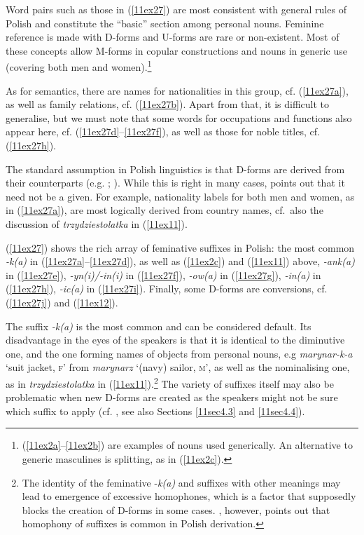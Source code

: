 \documentclass[output=paper,colorlinks,citecolor=brown]{langscibook}
\begin{document}
Word pairs such as those in (\ref{11ex27}) are most consistent with general rules of Polish and constitute the ``basic'' \citep[49]{kucala1978} section among personal nouns. Feminine reference is made with D-forms and U-forms are rare or non-existent. Most of these concepts allow M-forms in copular constructions and  nouns in generic use (covering both men and women).\footnote{(\ref{11ex2a}--\ref{11ex2b}) are examples of  nouns used generically. An alternative to generic masculines is splitting, as in (\ref{11ex2c}).}

As for semantics, there are names for nationalities in this group, cf. (\ref{11ex27a}), as well as family relations, cf. (\ref{11ex27b}). Apart from that, it is difficult to generalise, but we must note that some words for occupations and functions also appear here, cf. (\ref{11ex27d}--\ref{11ex27f}), as well as those for noble titles, cf. (\ref{11ex27h}).

The standard assumption in Polish linguistics is that D-forms are derived from their  counterparts (e.g. \citealt[422]{grzegorczykowa1998-rzeczownik}; \citealt[49]{kucala1978}). While this is right in many cases, \citet[134--135]{szpyra-kozlowska2021} points out that it need not be a given. For example, nationality labels for both men and women, as in (\ref{11ex27a}), are most logically derived from country names, cf.~also the discussion of \emph{trzydziestolatka} in (\ref{11ex11}).

(\ref{11ex27}) shows the rich array of feminative suffixes in Polish: the most common \emph{-k(a)} in (\ref{11ex27a}--\ref{11ex27d}), as well as (\ref{11ex2c}) and (\ref{11ex11}) above, \emph{-ank(a)} in (\ref{11ex27e}), \emph{-yn(i)/}\emph{-in(i)} in (\ref{11ex27f}), \emph{-ow(a)} in (\ref{11ex27g}), \emph{-in(a)} in (\ref{11ex27h}), \emph{-ic(a)} in (\ref{11ex27i}). Finally, some D-forms are conversions, cf. (\ref{11ex27j}) and (\ref{11ex12}).

The suffix \emph{-k(a)} is the most common and can be considered default. Its disadvantage in the eyes of the speakers is that it is identical to the diminutive one, and the one forming names of objects from personal nouns, e.g \emph{marynar-k-a }`suit jacket, \textsc{f}' from \emph{marynarz} `(navy) sailor, \textsc{m}', as well as the nominalising one, as in \emph{trzydziestolatka} in (\ref{11ex11}).\footnote{The identity of the feminative -\emph{k(a)} and suffixes with other meanings may lead to emergence of excessive homophones, which is a factor that supposedly blocks the creation of D-forms in some cases. \citet[191--192, 262--265]{szpyra-kozlowska2021}, however, points out that homophony of suffixes is common in Polish derivation.\label{11ftn25}} The variety of suffixes itself may also be problematic when new D-forms are created as the speakers might not be sure which suffix to apply (cf. \citealt{szpyra-kozlowska2019}, see also Sections \ref{11sec4.3} and \ref{11sec4.4}).
\end{document}
